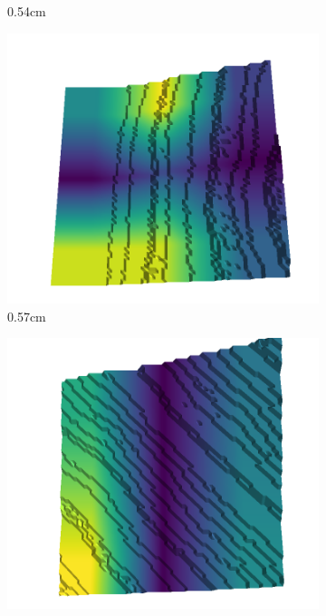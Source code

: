 \begin{figure}[H]
\begin{subfigure}[b]{0.192\linewidth}
    \caption{0.54cm}
    \label{fig : quarry-best-10}
    \end{subfigure}
    \begin{subfigure}[b]{0.192\linewidth}
    \includegraphics[width=\linewidth]{../img/5/quarry/best/56-patch-3d-majavi-colormap-110.png}
    \caption{0.57cm}
    \label{fig : quarry-best-11}
    \end{subfigure}
    \begin{subfigure}[b]{0.192\linewidth}
    \includegraphics[width=\linewidth]{../img/5/quarry/best/58-patch-3d-majavi-colormap-120.png}

\end{subfigure}
\end{figure}

